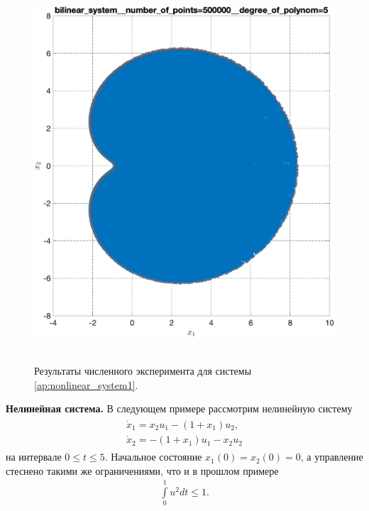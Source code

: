 \documentclass[../main.tex]{subfiles}
\begin{document}
\begin{figure}[ht!]
\begin{minipage}[b]{.4\linewidth}
  	\end{minipage}
  	\hfill
  	\begin{minipage}[b]{.4\linewidth} 
  		\small
  		\centering
  		\includegraphics[width=\linewidth]{images/bilinear_system__number_of_points=500000__degree_of_polynom=5.eps}
  	\end{minipage} 
  	\caption{Результаты численного эксперимента для системы \eqref{ap:nonlinear_system1}.}\label{fig:ap:rs_nonlinear1}
  \end{figure}
  
   \textbf{Нелинейная система.} В следующем примере рассмотрим нелинейную систему 
   \begin{gather}\label{ap:nonlinear_system1}
   	\begin{gathered}
   	\dot{x}_1 = x_2 u_1 - (1 + x_1) u_2,\\
   	\dot{x}_2 = -(1 + x_1) u_1 - x_2 u_2
   	\end{gathered}
   \end{gather}
   на интервале  $ 0 \leqslant t \leqslant 5$.
    Начальное состояние $x_1(0) = x_2(0) = 0 $, а управление стеснено такими же ограничениями, что и в прошлом примере
   \begin{gather*}
   	\int\limits_0^1 u^2dt \leqslant 1.
   \end{gather*}
   
\end{document}

